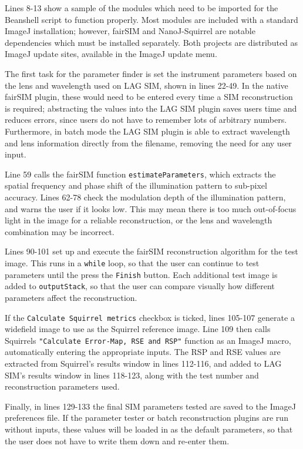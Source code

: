 Lines 8-13 show a sample of the modules which need to be imported for the Beanshell script to function properly. 
Most modules are included with a standard ImageJ installation; however, fairSIM and NanoJ-Squirrel are notable dependencies which must be installed separately. 
Both projects are distributed as ImageJ update sites, available in the ImageJ update menu. 

The first task for the parameter finder is set the instrument parameters based on the lens and wavelength used on LAG SIM, shown in lines 22-49. 
In the native fairSIM plugin, these would need to be entered every time a SIM reconstruction is required; abstracting the values into the LAG SIM plugin saves users time and reduces errors, since users do not have to remember lots of arbitrary numbers. 
Furthermore, in batch mode the LAG SIM plugin is able to extract wavelength and lens information directly from the filename, removing the need for any user input. 

Line 59 calls the fairSIM function \texttt{estimateParameters}, which extracts the spatial frequency and phase shift of the illumination pattern to sub-pixel accuracy. 
Lines 62-78 check the modulation depth of the illumination pattern, and warns the user if it looks low.
This may mean there is too much out-of-focus light in the image for a reliable reconstruction, or the lens and wavelength combination may be incorrect. 

Lines 90-101 set up and execute the fairSIM reconstruction algorithm for the test image.
This runs in a \texttt{while} loop, so that the user can continue to test parameters until the press the \texttt{Finish} button. 
Each additional test image is added to \texttt{outputStack}, so that the user can compare visually how different parameters affect the reconstruction. 

If the \texttt{Calculate Squirrel metrics} checkbox is ticked, lines 105-107 generate a widefield image to use as the Squirrel reference image. 
Line 109 then calls Squirrels \texttt{"Calculate Error-Map, RSE and RSP"} function as an ImageJ macro, automatically entering the appropriate inputs. 
The RSP and RSE values are extracted from Squirrel's results window in lines 112-116, and added to LAG SIM's results window in lines 118-123, along with the test number and reconstruction parameters used. 

Finally, in lines 129-133 the final SIM parameters tested are saved to the ImageJ preferences file. 
If the parameter tester or batch reconstruction plugins are run without inputs, these values will be loaded in as the default parameters, so that the user does not have to write them down and re-enter them. 

